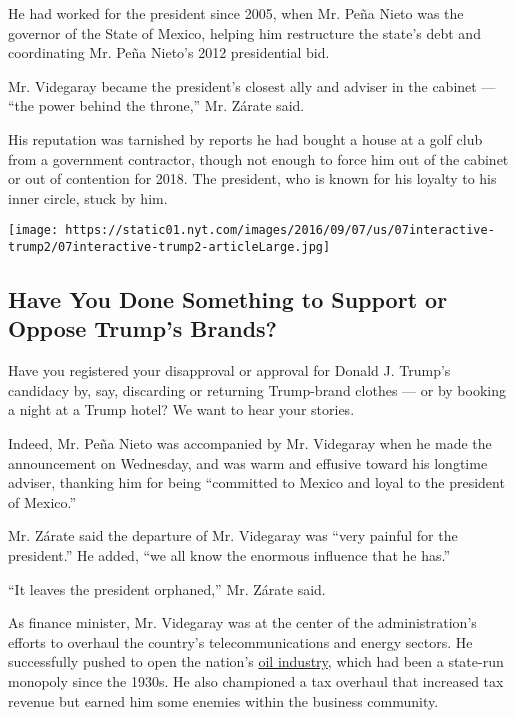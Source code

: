 He had worked for the president since 2005, when Mr. Peña Nieto was the
governor of the State of Mexico, helping him restructure the state's
debt and coordinating Mr. Peña Nieto's 2012 presidential bid.

Mr. Videgaray became the president's closest ally and adviser in the
cabinet --- ``the power behind the throne,'' Mr. Zárate said.

His reputation was tarnished by reports he had bought a house at a golf
club from a government contractor, though not enough to force him out of
the cabinet or out of contention for 2018. The president, who is known
for his loyalty to his inner circle, stuck by him.

\href{https://www.nytimes.com/interactive/2016/09/07/us/politics/trump-products-reaction.html}{}

\texttt{[image: https://static01.nyt.com/images/2016/09/07/us/07interactive-trump2/07interactive-trump2-articleLarge.jpg]}

\hypertarget{have-you-done-something-to-support-or-oppose-trumps-brands}{%
\subsection{Have You Done Something to Support or Oppose Trump's
Brands?}\label{have-you-done-something-to-support-or-oppose-trumps-brands}}

Have you registered your disapproval or approval for Donald J. Trump's
candidacy by, say, discarding or returning Trump-brand clothes --- or by
booking a night at a Trump hotel? We want to hear your stories.

Indeed, Mr. Peña Nieto was accompanied by Mr. Videgaray when he made the
announcement on Wednesday, and was warm and effusive toward his longtime
adviser, thanking him for being ``committed to Mexico and loyal to the
president of Mexico.''

Mr. Zárate said the departure of Mr. Videgaray was ``very painful for
the president.'' He added, ``we all know the enormous influence that he
has.''

``It leaves the president orphaned,'' Mr. Zárate said.

As finance minister, Mr. Videgaray was at the center of the
administration's efforts to overhaul the country's telecommunications
and energy sectors. He successfully pushed to open the nation's
\href{http://www.nytimes.com/topic/subject/oil-and-gasoline?inline=nyt-classifier}{oil
industry}, which had been a state-run monopoly since the 1930s. He also
championed a tax overhaul that increased tax revenue but earned him some
enemies within the business community.

